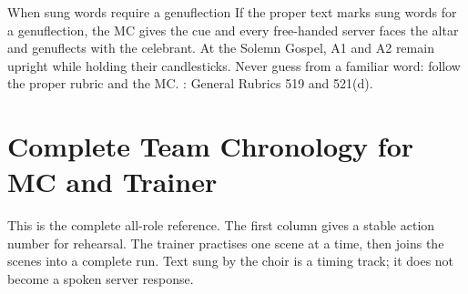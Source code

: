 \begin{watchbox}{When sung words require a genuflection}
If the proper text marks sung words for a genuflection, the MC gives the cue
and every free-handed server faces the altar and genuflects with the celebrant.
At the Solemn Gospel, A1 and A2 remain upright while holding their
candlesticks. Never guess from a familiar word: follow the proper rubric and
the MC. \MissalRule: General Rubrics 519 and 521(d).
\end{watchbox}

\section{Complete Team Chronology for MC and Trainer}

This is the complete all-role reference.  The first column gives a stable
action number for rehearsal. The trainer practises one scene at a time, then
joins the scenes into a complete run.  Text sung by the choir is a timing
track; it does not become a spoken server response.


